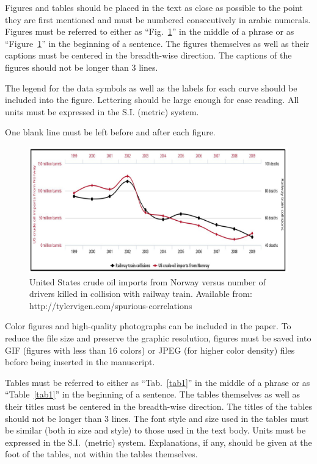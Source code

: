 \documentclass[10pt,fleqn,a4paper,twoside]{article}
\begin{document}
Figures and tables should be placed in the text as close as possible to the point they are first mentioned and must be numbered consecutively in arabic numerals. Figures must be referred to either as ``Fig.~\ref{fig1}'' in the middle of a phrase or as ``Figure~\ref{fig1}'' in the beginning of a sentence. The figures themselves as well as their captions must be centered in the breadth-wise direction. The captions of the figures should not be longer than 3 lines.

The legend for the data symbols as well as the labels for each curve should be included into the figure. Lettering should be large enough for ease reading. All units must be expressed in the S.I. (metric) system.

One blank line must be left before and after each figure.
\begin{figure}[h!]
\centering
\includegraphics[angle=0, scale=0.320]{Figures/figure.jpeg}
\caption{United States crude oil imports from Norway versus number of drivers killed in collision with railway train. Available from: http://tylervigen.com/spurious-correlations}
\label{fig1}
\end{figure}

Color figures and high-quality photographs can be included in the paper. To reduce the file size and preserve the graphic resolution, figures must be saved into GIF (figures with less than 16 colors) or JPEG (for higher color density) files before being inserted in the manuscript.

Tables must be referred to either as ``Tab.~\ref{tab1}'' in the middle of a phrase or as ``Table~\ref{tab1}'' in the beginning of a sentence.  The tables themselves as well as their titles must be centered in the breadth-wise direction. The titles of the tables should not be longer than 3 lines. The font style and size used in the tables must be similar (both in size and style) to those used in the text body. Units must be expressed in the S.I.\ (metric) system. Explanations, if any, should be given at the foot of the tables, not within the tables themselves.
\end{document}
